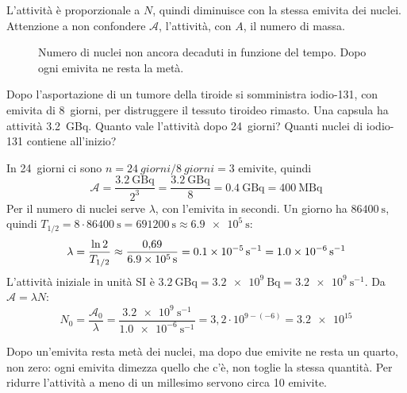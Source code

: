 L'attività è proporzionale a $N$, quindi diminuisce con la stessa emivita dei nuclei. Attenzione a non confondere $\mathcal{A}$, l'attività, con $A$, il numero di massa.

\begin{figure}[h]
\centering

\caption{Numero di nuclei non ancora decaduti in funzione del tempo. Dopo ogni emivita ne resta la metà.}
\label{fig:ud7-decadimento}
\end{figure}

\begin{esempio}
Dopo l'asportazione di un tumore della tiroide si somministra iodio-131, con emivita di \SI{8}{giorni}, per distruggere il tessuto tiroideo rimasto. Una capsula ha attività \SI{3,2}{\giga\becquerel}. Quanto vale l'attività dopo \SI{24}{giorni}? Quanti nuclei di iodio-131 contiene all'inizio?

In \SI{24}{giorni} ci sono $n = \SI{24}{giorni} / \SI{8}{giorni} = 3$ emivite, quindi
\[
  \mathcal{A} = \frac{\SI{3,2}{\giga\becquerel}}{2^3} = \frac{\SI{3,2}{\giga\becquerel}}{8} = \SI{0,4}{\giga\becquerel} = \SI{400}{\mega\becquerel}
\]
Per il numero di nuclei serve $\lambda$, con l'emivita in secondi. Un giorno ha $\SI{86400}{\second}$, quindi $T_{1/2} = 8 \cdot \SI{86400}{\second} = \SI{691200}{\second} \approx \SI{6,9e5}{\second}$:
\[
  \lambda = \frac{\ln 2}{T_{1/2}} \approx \frac{0{,}69}{\SI{6,9e5}{\second}} = \num{0,1e-5}\,\si[per-mode=power]{\second\tothe{-1}} = \SI[per-mode=power]{1,0e-6}{\second\tothe{-1}}
\]
L'attività iniziale in unità SI è $\SI{3,2}{\giga\becquerel} = \SI{3,2e9}{\becquerel} = \SI[per-mode=power]{3,2e9}{\second\tothe{-1}}$. Da $\mathcal{A} = \lambda N$:
\[
  N_0 = \frac{\mathcal{A}_0}{\lambda} = \frac{\SI[per-mode=power]{3,2e9}{\second\tothe{-1}}}{\SI[per-mode=power]{1,0e-6}{\second\tothe{-1}}} = 3{,}2 \cdot 10^{9-(-6)} = \num{3,2e15}
\]
\end{esempio}

\begin{attenzione}
Dopo un'emivita resta metà dei nuclei, ma dopo due emivite ne resta un quarto, non zero: ogni emivita dimezza quello che c'è, non toglie la stessa quantità. Per ridurre l'attività a meno di un millesimo servono circa 10 emivite.
\end{attenzione}



